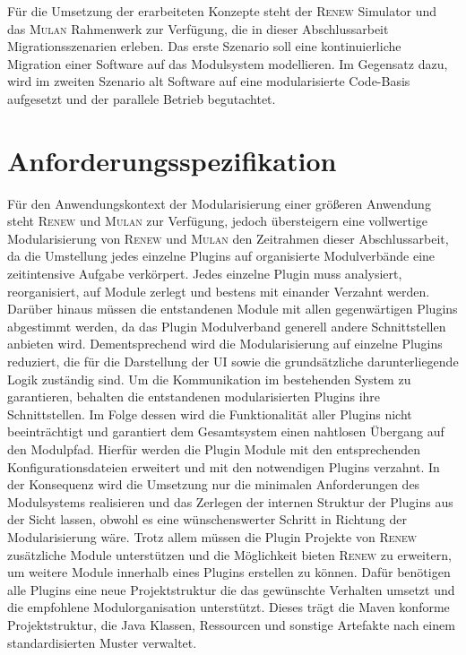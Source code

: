 	Für die Umsetzung der erarbeiteten Konzepte steht der \textsc{Renew} Simulator und das \textsc{Mulan} Rahmenwerk zur Verfügung, die in dieser Abschlussarbeit Migrationsszenarien erleben.\newline 
	Das erste Szenario soll eine kontinuierliche Migration einer Software auf das Modulsystem modellieren. Im Gegensatz dazu, wird im zweiten Szenario alt Software auf eine modularisierte Code-Basis aufgesetzt und der parallele Betrieb begutachtet.  

\section{Anforderungsspezifikation} 
	Für den Anwendungskontext der Modularisierung einer größeren Anwendung steht \textsc{Renew} und \textsc{Mulan} zur Verfügung, jedoch übersteigern eine vollwertige Modularisierung von \textsc{Renew} und \textsc{Mulan} den Zeitrahmen dieser Abschlussarbeit, da die Umstellung jedes einzelne Plugins auf organisierte Modulverbände eine zeitintensive Aufgabe verkörpert. Jedes einzelne Plugin muss analysiert, reorganisiert, auf Module zerlegt und bestens mit einander Verzahnt werden. Darüber hinaus müssen die entstandenen Module mit allen gegenwärtigen Plugins abgestimmt werden, da das Plugin Modulverband generell andere Schnittstellen anbieten wird. \bigbreak
	Dementsprechend wird die Modularisierung auf einzelne Plugins reduziert, die für die Darstellung der UI sowie die grundsätzliche darunterliegende Logik zuständig sind. Um die Kommunikation im bestehenden System zu garantieren, behalten die entstandenen modularisierten Plugins ihre Schnittstellen. Im Folge dessen wird die Funktionalität aller Plugins nicht beeinträchtigt und garantiert dem Gesamtsystem einen nahtlosen Übergang auf den Modulpfad. Hierfür werden die Plugin Module mit den entsprechenden Konfigurationsdateien erweitert und mit den notwendigen Plugins verzahnt. In der Konsequenz wird die Umsetzung nur die minimalen Anforderungen des Modulsystems realisieren und das Zerlegen der internen Struktur der Plugins aus der Sicht lassen, obwohl es eine wünschenswerter Schritt in Richtung der Modularisierung wäre. \newline 
	Trotz allem müssen die Plugin Projekte von \textsc{Renew} zusätzliche Module unterstützen und die Möglichkeit bieten \textsc{Renew} zu erweitern, um weitere Module innerhalb eines Plugins erstellen zu können. Dafür benötigen alle Plugins eine neue Projektstruktur die das gewünschte Verhalten umsetzt und die empfohlene Modulorganisation unterstützt. Dieses trägt die Maven konforme Projektstruktur, die Java Klassen, Ressourcen und sonstige Artefakte nach einem standardisierten Muster verwaltet.  \bigbreak

